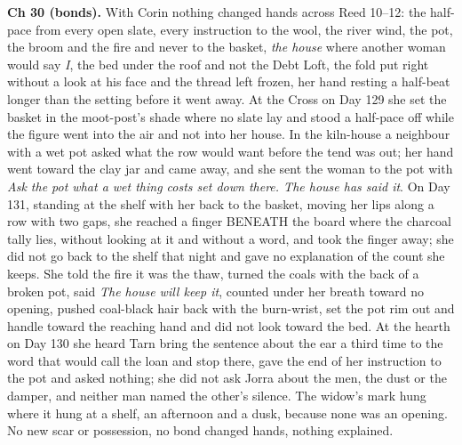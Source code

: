 \documentclass{design/chronicle}
\begin{document}
{\textbf{Ch 30 (bonds).} With Corin nothing changed hands across Reed 10–12: the half-pace from every open slate, every instruction to the wool, the river wind, the pot, the broom and the fire and never to the basket, \emph{the house} where another woman would say \emph{I}, the bed under the roof and not the Debt Loft, the fold put right without a look at his face and the thread left frozen, her hand resting a half-beat longer than the setting before it went away. At the Cross on Day 129 she set the basket in the moot-post’s shade where no slate lay and stood a half-pace off while the figure went into the air and not into her house. In the kiln-house a neighbour with a wet pot asked what the row would want before the tend was out; her hand went toward the clay jar and came away, and she sent the woman to the pot with \emph{Ask the pot what a wet thing costs set down there. The house has said it}. On Day 131, standing at the shelf with her back to the basket, moving her lips along a row with two gaps, she reached a finger BENEATH the board where the charcoal tally lies, without looking at it and without a word, and took the finger away; she did not go back to the shelf that night and gave no explanation of the count she keeps. She told the fire it was the thaw, turned the coals with the back of a broken pot, said \emph{The house will keep it}, counted under her breath toward no opening, pushed coal-black hair back with the burn-wrist, set the pot rim out and handle toward the reaching hand and did not look toward the bed. At the hearth on Day 130 she heard Tarn bring the sentence about the ear a third time to the word that would call the loan and stop there, gave the end of her instruction to the pot and asked nothing; she did not ask Jorra about the men, the dust or the damper, and neither man named the other’s silence. The widow’s mark hung where it hung at a shelf, an afternoon and a dusk, because none was an opening. No new scar or possession, no bond changed hands, nothing explained.

}
\end{document}

